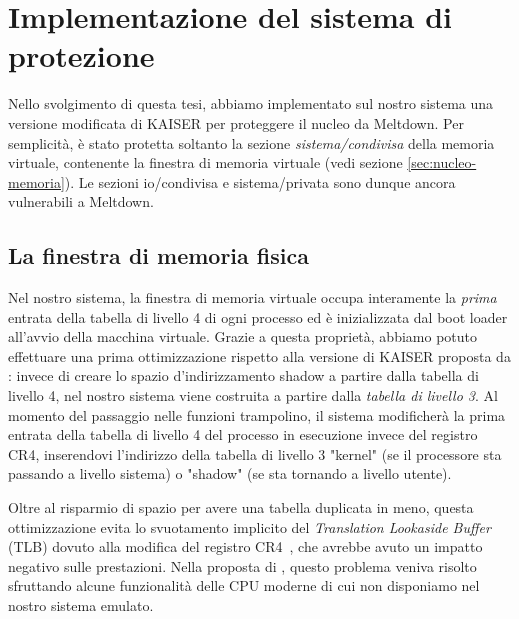 \chapter{Implementazione del sistema di protezione}
\label{cap:implementazione}
Nello svolgimento di questa tesi, abbiamo implementato sul nostro sistema una versione modificata di KAISER per proteggere il nucleo da Meltdown. 
Per semplicità, è stato protetta soltanto la sezione \emph{sistema/condivisa} della memoria virtuale, contenente la finestra di memoria virtuale (vedi sezione \vref{sec:nucleo-memoria}).
Le sezioni io/condivisa e sistema/privata sono dunque ancora vulnerabili a Meltdown.

\section{La finestra di memoria fisica}
Nel nostro sistema, la finestra di memoria virtuale occupa interamente la \emph{prima} entrata della tabella di livello 4 di ogni processo ed è inizializzata dal boot loader all'avvio della macchina virtuale.
Grazie a questa proprietà, abbiamo potuto effettuare una prima ottimizzazione rispetto alla versione di KAISER proposta da \textcite{gruss:kaslr}: invece di creare lo spazio d'indirizzamento shadow a partire dalla tabella di livello 4, nel nostro sistema viene costruita a partire dalla \emph{tabella di livello 3}.
Al momento del passaggio nelle funzioni trampolino, il sistema modificherà la prima entrata della tabella di livello 4 del processo in esecuzione invece del registro CR4, inserendovi l'indirizzo della tabella di livello 3 "kernel" (se il processore sta passando a livello sistema) o "shadow" (se sta tornando a livello utente).

Oltre al risparmio di spazio per avere una tabella duplicata in meno, questa ottimizzazione evita lo svuotamento implicito del \emph{Translation Lookaside Buffer} (TLB) dovuto alla modifica del registro CR4~\cite{gruss:kaslr}, che avrebbe avuto un impatto negativo sulle prestazioni. 
Nella proposta di \textcite{gruss:kaslr}, questo problema veniva risolto sfruttando alcune funzionalità delle CPU moderne di cui non disponiamo nel nostro sistema emulato.

